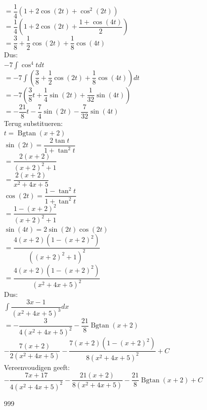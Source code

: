 \documentclass[a4paper]{article}
\newcommand{\dint}{\displaystyle\int}
\newcommand{\Bgtan}{\operatorname{Bgtan}}
\begin{document}
$=
\dfrac14(1+2\cos(2t)+\cos^2(2t))$\\

$=
\dfrac14
\left(
1+2\cos(2t)+\dfrac{1+\cos(4t)}2
\right)$\\

$=
\dfrac38+\dfrac12\cos(2t)+\dfrac18\cos(4t)$\\

Dus:\\

$-7\dint\cos^4t dt$\\

$=
-7\dint
\left(
\dfrac38+\dfrac12\cos(2t)+\dfrac18\cos(4t)
\right)dt$\\

$=
-7
\left(
\dfrac38t+\dfrac14\sin(2t)+\dfrac1{32}\sin(4t)
\right)$\\

$=
-\dfrac{21}{8}t-\dfrac74\sin(2t)-\dfrac7{32}\sin(4t)$\\

Terug substitueren:\\

$t=\Bgtan(x+2)$\\

$\sin(2t)=\dfrac{2\tan t}{1+\tan^2t}$\\

$=
\dfrac{2(x+2)}{(x+2)^2+1}$\\

$=
\dfrac{2(x+2)}{x^2+4x+5}$\\

$\cos(2t)=\dfrac{1-\tan^2t}{1+\tan^2t}$\\

$=
\dfrac{1-(x+2)^2}{(x+2)^2+1}$\\

$\sin(4t)=2\sin(2t)\cos(2t)$\\

$=
\dfrac{4(x+2)(1-(x+2)^2)}
{((x+2)^2+1)^2}$\\

$=
\dfrac{4(x+2)(1-(x+2)^2)}
{(x^2+4x+5)^2}$\\

Dus:\\

$\dint\dfrac{3x-1}{(x^2+4x+5)^3}dx$\\

$=
-\dfrac{3}{4(x^2+4x+5)^2}
-\dfrac{21}{8}\Bgtan(x+2)$\\

$-\dfrac{7(x+2)}{2(x^2+4x+5)}
-\dfrac{7(x+2)(1-(x+2)^2)}
{8(x^2+4x+5)^2}
+C$\\

Vereenvoudigen geeft:\\

$\boxed{
-\dfrac{7x+17}{4(x^2+4x+5)^2}
-\dfrac{21(x+2)}{8(x^2+4x+5)}
-\dfrac{21}{8}\Bgtan(x+2)
+C
}$\\

\begin{thebibliography}{999}
\end{thebibliography}
\end{document}
